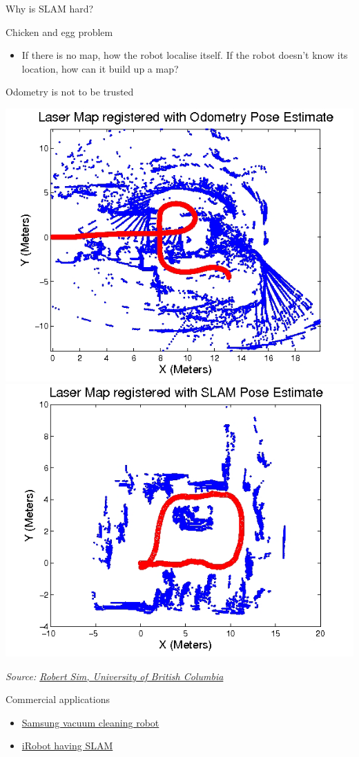 \documentclass[compress]{beamer}
\newcommand{\source}[2]{{\tiny\it Source: \href{#1}{#2}}}
\begin{document}
\begin{frame}{Why is SLAM hard?}

Chicken and egg problem

\begin{itemize}
\item If there is no map, how the robot localise itself. If the robot
  doesn't know its location, how can it build up a map?
\end{itemize}

Odometry is not to be trusted

    \begin{center}
        \includegraphics[width=0.4\linewidth]{slam1}
        \hspace{1em}
        \includegraphics[width=0.4\linewidth]{slam2}
    \end{center}
\end{frame}

\begin{frame}[plain]

    \begin{center}

    \source{http://youtu.be/Q1ipn42rMh8}{Robert Sim, University of British Columbia}
    \end{center}

\end{frame}


\begin{frame}{Commercial applications}

\begin{itemize}
\item \href{https://www.youtube.com/watch?v=bq5HZzGF3vQ}{Samsung vacuum
  cleaning robot}
\item \href{https://www.youtube.com/watch?v=bq5HZzGF3vQ}{iRobot having SLAM}
\end{itemize}

\end{frame}
\end{document}

